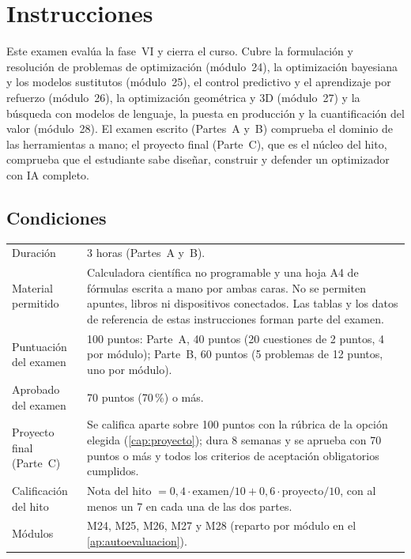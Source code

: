 \chapter*{Instrucciones}

Este examen evalúa la fase~VI y cierra el curso. Cubre la formulación y resolución de problemas de optimización (módulo~24), la optimización bayesiana y los modelos sustitutos (módulo~25), el control predictivo y el aprendizaje por refuerzo (módulo~26), la optimización geométrica y 3D (módulo~27) y la búsqueda con modelos de lenguaje, la puesta en producción y la cuantificación del valor (módulo~28). El examen escrito (Partes~A y~B) comprueba el dominio de las herramientas a mano; el proyecto final (Parte~C), que es el núcleo del hito, comprueba que el estudiante sabe diseñar, construir y defender un optimizador con IA completo.

\section*{Condiciones}
\begin{center}
\small
\begin{tabularx}{\textwidth}{@{}lX@{}}
\toprule
Duración & 3 horas (Partes~A y~B). \\
Material permitido & Calculadora científica no programable y una hoja A4 de fórmulas escrita a mano por ambas caras. No se permiten apuntes, libros ni dispositivos conectados. Las tablas y los datos de referencia de estas instrucciones forman parte del examen. \\
Puntuación del examen & 100 puntos: Parte~A, 40 puntos (20 cuestiones de 2 puntos, 4 por módulo); Parte~B, 60 puntos (5 problemas de 12 puntos, uno por módulo). \\
Aprobado del examen & 70 puntos (70\,\%) o más. \\
Proyecto final (Parte~C) & Se califica aparte sobre 100 puntos con la rúbrica de la opción elegida (\cref{cap:proyecto}); dura 8 semanas y se aprueba con 70 puntos o más y todos los criterios de aceptación obligatorios cumplidos. \\
Calificación del hito & Nota del hito $=0{,}4\cdot\text{examen}/10+0{,}6\cdot\text{proyecto}/10$, con al menos un 7 en cada una de las dos partes. \\
Módulos & M24, M25, M26, M27 y M28 (reparto por módulo en el \cref{ap:autoevaluacion}). \\
\bottomrule
\end{tabularx}
\end{center}

